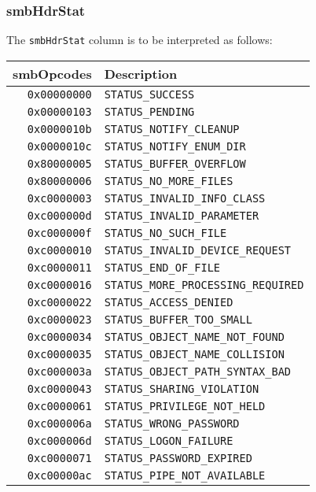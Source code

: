 \documentclass[documentation]{subfiles}
\begin{document}
\subsubsection{smbHdrStat}\label{smbHdrStat}
The {\tt smbHdrStat} column is to be interpreted as follows:
\begin{longtable}{rl}
    \toprule
    {\bf smbOpcodes} & {\bf Description}\\
    \midrule\endhead%
    {\tt 0x00000000} & {\tt STATUS\_SUCCESS}\\
    {\tt 0x00000103} & {\tt STATUS\_PENDING}\\
    {\tt 0x0000010b} & {\tt STATUS\_NOTIFY\_CLEANUP}\\
    {\tt 0x0000010c} & {\tt STATUS\_NOTIFY\_ENUM\_DIR}\\
    {\tt 0x80000005} & {\tt STATUS\_BUFFER\_OVERFLOW}\\
    {\tt 0x80000006} & {\tt STATUS\_NO\_MORE\_FILES}\\
    {\tt 0xc0000003} & {\tt STATUS\_INVALID\_INFO\_CLASS}\\
    {\tt 0xc000000d} & {\tt STATUS\_INVALID\_PARAMETER}\\
    {\tt 0xc000000f} & {\tt STATUS\_NO\_SUCH\_FILE}\\
    {\tt 0xc0000010} & {\tt STATUS\_INVALID\_DEVICE\_REQUEST}\\
    {\tt 0xc0000011} & {\tt STATUS\_END\_OF\_FILE}\\
    {\tt 0xc0000016} & {\tt STATUS\_MORE\_PROCESSING\_REQUIRED}\\
    {\tt 0xc0000022} & {\tt STATUS\_ACCESS\_DENIED}\\
    {\tt 0xc0000023} & {\tt STATUS\_BUFFER\_TOO\_SMALL}\\
    {\tt 0xc0000034} & {\tt STATUS\_OBJECT\_NAME\_NOT\_FOUND}\\
    {\tt 0xc0000035} & {\tt STATUS\_OBJECT\_NAME\_COLLISION}\\
    {\tt 0xc000003a} & {\tt STATUS\_OBJECT\_PATH\_SYNTAX\_BAD}\\
    {\tt 0xc0000043} & {\tt STATUS\_SHARING\_VIOLATION}\\
    {\tt 0xc0000061} & {\tt STATUS\_PRIVILEGE\_NOT\_HELD}\\
    {\tt 0xc000006a} & {\tt STATUS\_WRONG\_PASSWORD}\\
    {\tt 0xc000006d} & {\tt STATUS\_LOGON\_FAILURE}\\
    {\tt 0xc0000071} & {\tt STATUS\_PASSWORD\_EXPIRED}\\
    {\tt 0xc00000ac} & {\tt STATUS\_PIPE\_NOT\_AVAILABLE}\\

\end{longtable}
\end{document}
